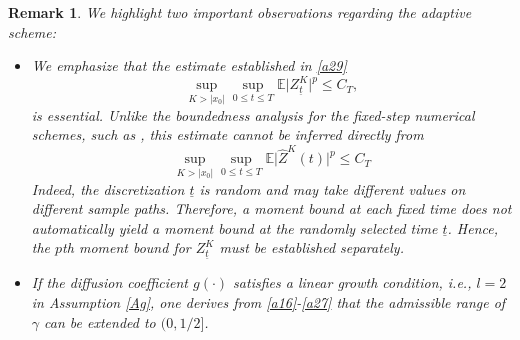 \documentclass[preprint,12pt,compress]{elsarticle}
\newtheorem{remark}[theorem]{Remark}
\begin{document}
\begin{remark}  \label{rem-a1}
We highlight two important observations regarding the adaptive scheme:
\begin{itemize}
\item[(i)] We emphasize that the estimate established in \eqref{a29}
\begin{equation*}
	\mathop {\sup }\limits_{K > |{x_0}|} \sup_{0 \le t \le T} \mathbb{E}\bigl| Z_{\underline{t}}^K \bigr|^p
	\le C_T,
\end{equation*}
is essential. Unlike the boundedness analysis for the fixed-step numerical schemes, such as \cite{mao2015the, sabanis2016euler}, this estimate cannot be inferred directly from
\begin{equation*}
	\mathop {\sup }\limits_{K > |{x_0}|} \sup_{0 \le t \le T} \mathbb{E}\bigl| \hat Z^K(t) \bigr|^p \le C_T
\end{equation*}
Indeed, the discretization $\underline{t}$ is random and may take different values on different sample paths. Therefore, a moment bound at each fixed time does not automatically yield a moment bound at the randomly selected time $\underline{t}$. Hence, the $p$th moment bound for $Z_{\underline{t}}^K$ must be established separately.

\item[(ii)] If the diffusion coefficient $g(\cdot)$ satisfies a linear growth condition, i.e., $l = 2$ in Assumption \ref{Ag}, one derives from \eqref{a16}-\eqref{a27} that the admissible range of $\gamma$ can be extended to $(0, 1/2]$.
\end{itemize}
\end{remark}
\end{document}
